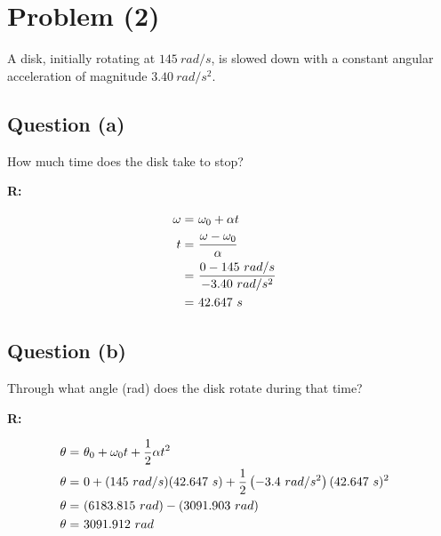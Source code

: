 \section{Problem (2)}

	A disk, initially rotating at $145 \ rad/s$, is slowed down with a constant angular acceleration of magnitude $3.40 \ rad/s^{2}$.

	\subsection{Question (a)}

		How much time does the disk take to stop?

		\textbf{R:}

		\begin{align}
			\omega = \ &\omega_{0} + \alpha t& \notag \\
			t = \ &\frac{\omega - \omega_{0}}{\alpha}& \notag \\
			= \ &\frac{0 - 145 \ rad/s}{-3.40 \ rad/s^{2}}& \notag \\
			= \ &42.647 \ s&
		\end{align}

	\subsection{Question (b)}

		Through what angle (rad) does the disk rotate during that time?

		\textbf{R:}

		\begin{align}
			\theta = \ &\theta_{0} + \omega_{0} t + \frac{1}{2}\alpha t^{2}& \notag \\
			\theta = \ &0 + (145 \ rad/s)(42.647 \ s) + \frac{1}{2}\left( -3.4 \ rad/s^{2} \right) (42.647 \ s)^{2}& \notag \\
			\theta = \ &(6183.815 \ rad) - (3091.903 \ rad)& \notag \\
			\theta = \ &3091.912 \ rad&
		\end{align}
